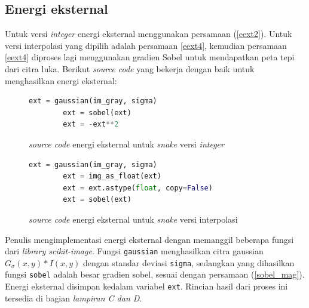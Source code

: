 \subsection{Energi eksternal}
Untuk versi \emph{integer} energi eksternal menggunakan persamaan (\ref{eext2}). Untuk versi interpolasi yang dipilih adalah persamaan \ref{eext4}, kemudian persamaan \ref{eext4} diproses lagi menggunakan gradien Sobel untuk mendapatkan peta tepi dari citra luka. Berikut \emph{source code} yang bekerja dengan baik untuk menghasilkan energi eksternal:
\begin{figure}[H]
	\begin{lstlisting}[language=Python, basicstyle=\tiny]
		ext = gaussian(im_gray, sigma)
		ext = sobel(ext)
		ext = -ext**2
	\end{lstlisting}
	\caption{\emph{source code} energi eksternal untuk \emph{snake} versi \emph{integer}}
	\label{Gambar:external_int}
\end{figure}
\begin{figure}[H]
	\begin{lstlisting}[language=Python, basicstyle=\tiny]
		ext = gaussian(im_gray, sigma)
		ext = img_as_float(ext)
		ext = ext.astype(float, copy=False)
		ext = sobel(ext)
	\end{lstlisting}
	\caption{\emph{source code} energi eksternal untuk \emph{snake} versi interpolasi}
	\label{Gambar:external_float}
\end{figure}
Penulis mengimplementasi energi eksternal dengan memanggil beberapa fungsi dari \emph{library scikit-image}. Fungsi \texttt{gaussian} menghasilkan citra gaussian $G_{\sigma} (x,y) * I(x,y)$ dengan standar deviasi \texttt{sigma}, sedangkan yang dihasilkan fungsi \texttt{sobel} adalah besar gradien sobel, sesuai dengan persamaan (\ref{sobel_mag}). Energi eksternal disimpan kedalam variabel \texttt{ext}. Rincian hasil dari proses ini tersedia di bagian \emph{lampiran C dan D}.

